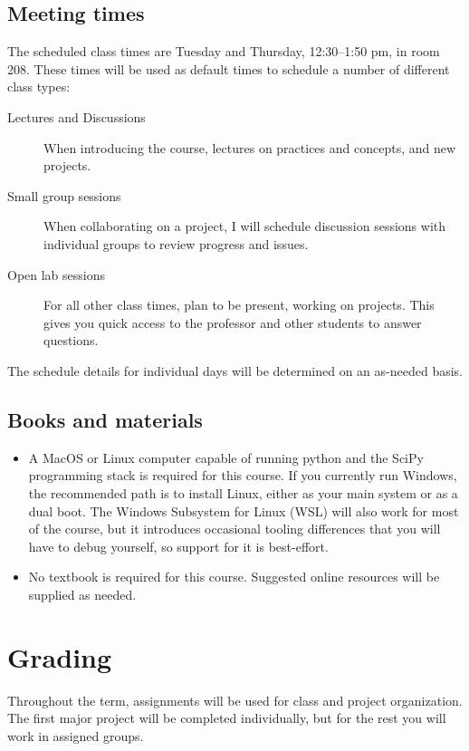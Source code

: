 \documentclass[12pt]{article}
\begin{document}
\subsection*{Meeting times}

The scheduled class times are Tuesday and Thursday, 12:30--1:50 pm, in room 208. These times will be used as default times to schedule a number of different class types:
\begin{description}
\item[Lectures and Discussions] When introducing the course, lectures on practices and concepts, and new projects.
\item[Small group sessions] When collaborating on a project, I will schedule discussion sessions with individual groups to review progress and issues.
\item[Open lab sessions] For all other class times, plan to be present, working on projects. This gives you quick access to the professor and other students to answer questions.

\end{description}
The schedule details for individual days will be determined on an as-needed basis.

\subsection*{Books and materials}

\begin{itemize}
\item A MacOS or Linux computer capable of running python and the SciPy programming stack is required for this course. If you currently run Windows, the recommended path is to install Linux, either as your main system or as a dual boot. The Windows Subsystem for Linux (WSL) will also work for most of the course, but it introduces occasional tooling differences that you will have to debug yourself, so support for it is best-effort.
\item No textbook is required for this course. Suggested online resources will be supplied as needed.
\end{itemize}

\section*{Grading}

Throughout the term, assignments will be used for class and project organization. The first major project will be completed individually, but for the rest you will work in assigned groups.
\end{document}

